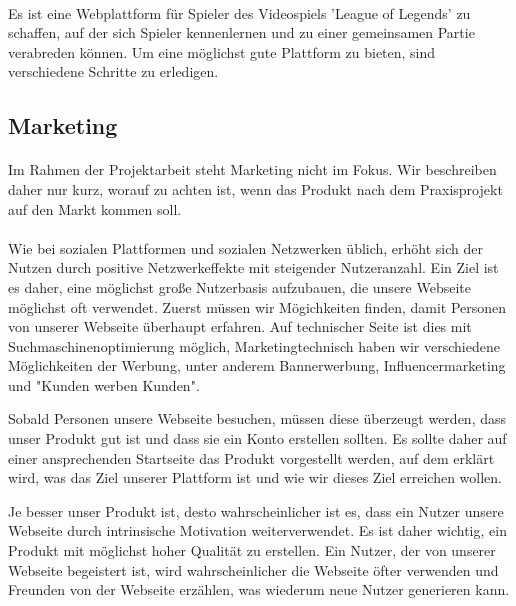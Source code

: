 \paragraph{}
Es ist eine Webplattform für Spieler des Videospiels 'League of Legends' zu schaffen, auf der sich Spieler kennenlernen und zu einer gemeinsamen Partie verabreden können. Um eine möglichst gute Plattform zu bieten, sind verschiedene Schritte zu erledigen.

\subsection{Marketing}
\paragraph{}
Im Rahmen der Projektarbeit steht Marketing nicht im Fokus. Wir beschreiben daher nur kurz, worauf zu achten ist, wenn das Produkt nach dem Praxisprojekt auf den Markt kommen soll.

\paragraph{}
Wie bei sozialen Plattformen und sozialen Netzwerken üblich, erhöht sich der Nutzen durch positive Netzwerkeffekte mit steigender Nutzeranzahl. Ein Ziel ist es daher, eine möglichst große Nutzerbasis aufzubauen, die unsere Webseite möglichst oft verwendet.
Zuerst müssen wir Mögichkeiten finden, damit Personen von unserer Webseite überhaupt erfahren. Auf technischer Seite ist dies mit Suchmaschinenoptimierung möglich, Marketingtechnisch haben wir verschiedene Möglichkeiten der Werbung, unter anderem Bannerwerbung, Influencermarketing und "Kunden werben Kunden".

Sobald Personen unsere Webseite besuchen, müssen diese überzeugt werden, dass unser Produkt gut ist und dass sie ein Konto erstellen sollten. Es sollte daher auf einer ansprechenden Startseite das Produkt vorgestellt werden, auf dem erklärt wird, was das Ziel unserer Plattform ist und wie wir dieses Ziel erreichen wollen.

Je besser unser Produkt ist, desto wahrscheinlicher ist es, dass ein Nutzer unsere Webseite durch intrinsische Motivation weiterverwendet. Es ist daher wichtig, ein Produkt mit möglichst hoher Qualität zu erstellen. Ein Nutzer, der von unserer Webseite begeistert ist, wird wahrscheinlicher die Webseite öfter verwenden und Freunden von der Webseite erzählen, was wiederum neue Nutzer generieren kann.

